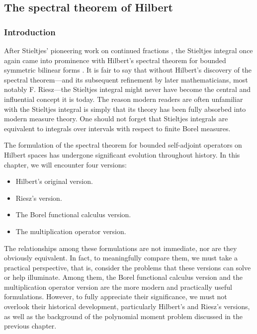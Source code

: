 \documentclass[12pt,b5paper,notitlepage]{article}
\theoremstyle{definition}
\theoremstyle{plain}
\numberwithin{equation}{section}
\begin{document}
\subsection{The spectral theorem of Hilbert}


\subsubsection{Introduction}

After Stieltjes' pioneering work on continued fractions \cite{Sti94}, the Stieltjes integral once again came into prominence with Hilbert’s spectral theorem for bounded symmetric bilinear forms \cite{Hil06}. It is fair to say that without Hilbert's discovery of the spectral theorem---and its subsequent refinement by later mathematicians, most notably F. Riesz---the Stieltjes integral might never have become the central and influential concept it is today. The reason modern readers are often unfamiliar with the Stieltjes integral is simply that its theory has been fully absorbed into modern measure theory. One should not forget that Stieltjes integrals are equivalent to integrals over intervals with respect to finite Borel measures.


The formulation of the spectral theorem for bounded self-adjoint operators on Hilbert spaces has undergone significant evolution throughout history. In this chapter, we will encounter four versions: 
\begin{itemize}
\item Hilbert's original version.
\item Riesz's version.
\item The Borel functional calculus version.
\item The multiplication operator version.
\end{itemize}
The relationships among these formulations are not immediate, nor are they obviously equivalent. In fact, to meaningfully compare them, we must take a practical perspective, that is, consider the problems that these versions can solve or help illuminate. Among them, the Borel functional calculus version and the multiplication operator version are the more modern and practically useful formulations. However, to fully appreciate their significance, we must not overlook their historical development, particularly Hilbert's and Riesz's versions, as well as the background of the polynomial moment problem discussed in the previous chapter.
\end{document}
